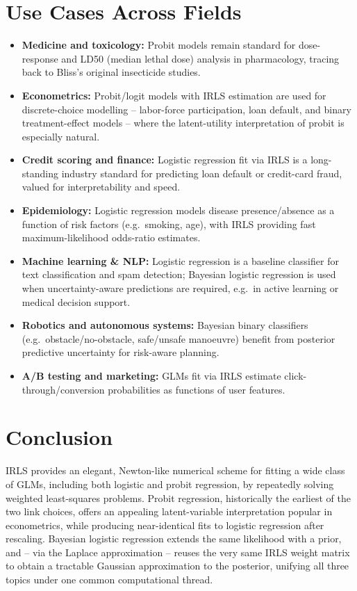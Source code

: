 \documentclass[a4paper,11pt]{article}
\begin{document}
\section{Use Cases Across Fields}
\begin{itemize}[leftmargin=*, itemsep=2pt]
\item \textbf{Medicine and toxicology:} Probit models remain standard for dose-response and LD50 (median lethal dose) analysis in pharmacology, tracing back to Bliss's original insecticide studies.
\item \textbf{Econometrics:} Probit/logit models with IRLS estimation are used for discrete-choice modelling -- labor-force participation, loan default, and binary treatment-effect models -- where the latent-utility interpretation of probit is especially natural.
\item \textbf{Credit scoring and finance:} Logistic regression fit via IRLS is a long-standing industry standard for predicting loan default or credit-card fraud, valued for interpretability and speed.
\item \textbf{Epidemiology:} Logistic regression models disease presence/absence as a function of risk factors (e.g.\ smoking, age), with IRLS providing fast maximum-likelihood odds-ratio estimates.
\item \textbf{Machine learning \& NLP:} Logistic regression is a baseline classifier for text classification and spam detection; Bayesian logistic regression is used when uncertainty-aware predictions are required, e.g.\ in active learning or medical decision support.
\item \textbf{Robotics and autonomous systems:} Bayesian binary classifiers (e.g.\ obstacle/no-obstacle, safe/unsafe manoeuvre) benefit from posterior predictive uncertainty for risk-aware planning.
\item \textbf{A/B testing and marketing:} GLMs fit via IRLS estimate click-through/conversion probabilities as functions of user features.
\end{itemize}

\section{Conclusion}
IRLS provides an elegant, Newton-like numerical scheme for fitting a wide class of GLMs, including both logistic and probit regression, by repeatedly solving weighted least-squares problems. Probit regression, historically the earliest of the two link choices, offers an appealing latent-variable interpretation popular in econometrics, while producing near-identical fits to logistic regression after rescaling. Bayesian logistic regression extends the same likelihood with a prior, and -- via the Laplace approximation -- reuses the very same IRLS weight matrix to obtain a tractable Gaussian approximation to the posterior, unifying all three topics under one common computational thread.
\end{document}
